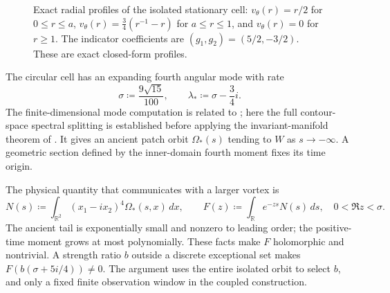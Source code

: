 \documentclass[11pt]{amsart}
\theoremstyle{remark}
\numberwithin{equation}{section}
\newcommand{\R}{\mathbb R}
\begin{document}
\begin{figure}[H]
\centering
{}
\caption{Exact radial profiles of the isolated stationary cell:
$v_\theta(r)=r/2$ for $0\le r\le a$,
$v_\theta(r)=\tfrac34(r^{-1}-r)$ for $a\le r\le1$,
and $v_\theta(r)=0$ for $r\ge1$. The indicator coefficients are
$(g_1,g_2)=(5/2,-3/2)$. These are exact closed-form profiles.}
\label{fig:cell}
\end{figure}

The circular cell has an expanding fourth angular mode with rate
\[
 \sigma\coloneqq\frac{9\sqrt{15}}{100},\qquad
 \lambda_*\coloneqq\sigma-\frac34i.
\]
The finite-dimensional mode computation is related to
\cite[Section~3]{CFMS}; here the full contour-space spectral splitting
is established before applying the invariant-manifold theorem of
\cite{CFL2003}. It gives an ancient patch orbit $\Omega_*(s)$ tending
to $W$ as $s\to-\infty$. A geometric section defined by the
inner-domain fourth moment fixes its time origin.

The physical quantity that communicates with a larger vortex is
\begin{equation}\label{intro:moment-transform}
 N(s)\coloneqq\int_{\R^2}(x_1-ix_2)^4\Omega_*(s,x)\,dx,
 \qquad F(z)\coloneqq\int_\R e^{-zs}N(s)\,ds,
 \quad 0<\Re z<\sigma.
\end{equation}
The ancient tail is exponentially small and nonzero to leading order;
the positive-time moment grows at most polynomially. These facts make
$F$ holomorphic and nontrivial. A strength ratio $b$ outside a discrete
exceptional set makes $F(b(\sigma+5i/4))\ne0$. The argument uses the
entire isolated orbit to select $b$, and only a fixed finite observation
window in the coupled construction.
\end{document}
